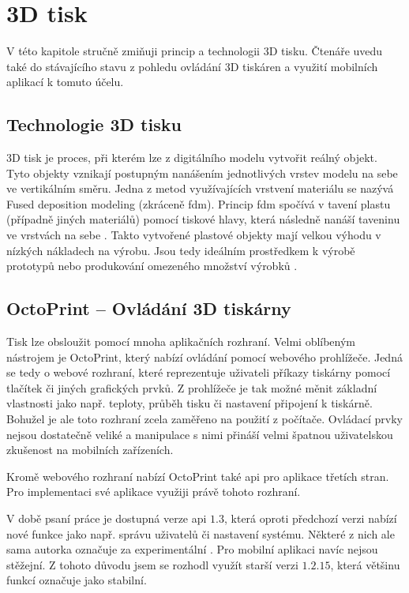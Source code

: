 \chapter{3D tisk}\label{3d-tisk}

V této kapitole stručně zmiňuji princip a technologii 3D tisku.
Čtenáře uvedu také do stávajícího stavu z pohledu ovládání 3D tiskáren a využití mobilních aplikací k tomuto účelu.

\section{Technologie 3D tisku}\label{3d-tisk-technologie}

3D tisk je proces, při kterém lze z digitálního modelu vytvořit reálný objekt.
Tyto objekty vznikají postupným nanášením jednotlivých vrstev modelu na sebe ve vertikálním směru.
Jedna z metod využívajících vrstvení materiálu se nazývá Fused deposition modeling (zkráceně \acrshort{fdm}).
Princip \acrshort{fdm} spočívá v tavení plastu (případně jiných materiálů) pomocí tiskové hlavy, která následně nanáší taveninu ve vrstvách na sebe \cite{3d-print-fdm}.
Takto vytvořené plastové objekty mají velkou výhodu v nízkých nákladech na výrobu.
Jsou tedy ideálním prostředkem k výrobě prototypů nebo produkování omezeného množství výrobků \cite{3d-print-for-prototyping}.

\section{OctoPrint -- Ovládání 3D tiskárny}\label{3d-tisk-ovladani}

Tisk lze obsloužit pomocí mnoha aplikačních rozhraní.
Velmi oblíbeným nástrojem je OctoPrint, který nabízí ovládání pomocí webového prohlížeče.
Jedná se tedy o webové rozhraní, které reprezentuje uživateli příkazy tiskárny pomocí tlačítek či jiných grafických prvků.
Z prohlížeče je tak možné měnit základní vlastnosti jako např. teploty, průběh tisku či nastavení připojení k tiskárně.
Bohužel je ale toto rozhraní zcela zaměřeno na použití z počítače.
Ovládací prvky nejsou dostatečně veliké a manipulace s nimi přináší velmi špatnou uživatelskou zkušenost na mobilních zařízeních.

Kromě webového rozhraní nabízí OctoPrint také \acrshort{api} pro aplikace třetích stran.
Pro implementaci své aplikace využiji právě tohoto rozhraní.

V době psaní práce je dostupná verze \gls{api} $1.3$, která oproti předchozí verzi nabízí nové funkce jako např. správu uživatelů či nastavení systému.
Některé z nich ale sama autorka označuje za experimentální \cite{octoprint-experimental-funcs}.
Pro mobilní aplikaci navíc nejsou stěžejní.
Z tohoto důvodu jsem se rozhodl využít starší verzi $1.2.15$, která většinu funkcí označuje jako stabilní.

